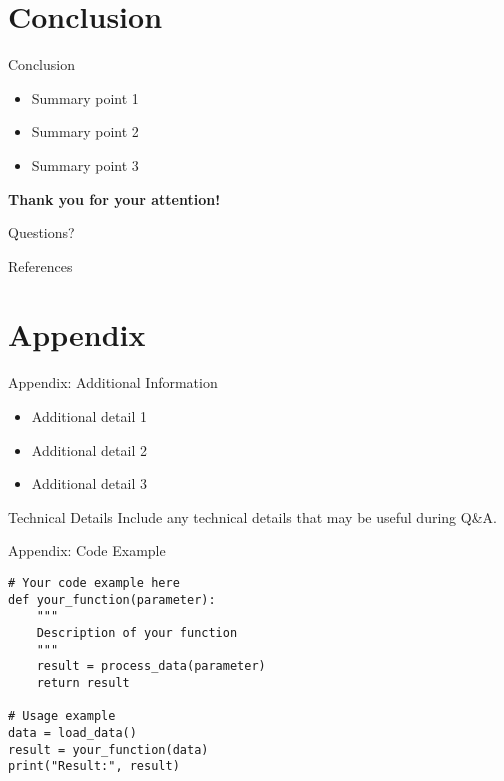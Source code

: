 \documentclass[aspectratio=169]{beamer}
\begin{document}
\section{Conclusion}

\begin{frame}{Conclusion}
  \begin{itemize}
    \item Summary point 1
    \item Summary point 2
    \item Summary point 3
  \end{itemize}
  
  \vspace{1cm}
  
  \begin{center}
    \large\textbf{Thank you for your attention!}
    
    \vspace{0.5cm}
    
    \normalsize
    Questions?
  \end{center}
\end{frame}

\begin{frame}[allowframebreaks]{References}
  \printbibliography
\end{frame}

\appendix
\section{Appendix}

\begin{frame}{Appendix: Additional Information}
  \begin{itemize}
    \item Additional detail 1
    \item Additional detail 2
    \item Additional detail 3
  \end{itemize}
  
  \begin{block}{Technical Details}
    Include any technical details that may be useful during Q\&A.
  \end{block}
\end{frame}

\begin{frame}[fragile]{Appendix: Code Example}
  \begin{verbatim}
# Your code example here
def your_function(parameter):
    """
    Description of your function
    """
    result = process_data(parameter)
    return result

# Usage example
data = load_data()
result = your_function(data)
print("Result:", result)
  \end{verbatim}
\end{frame}
\end{document}
